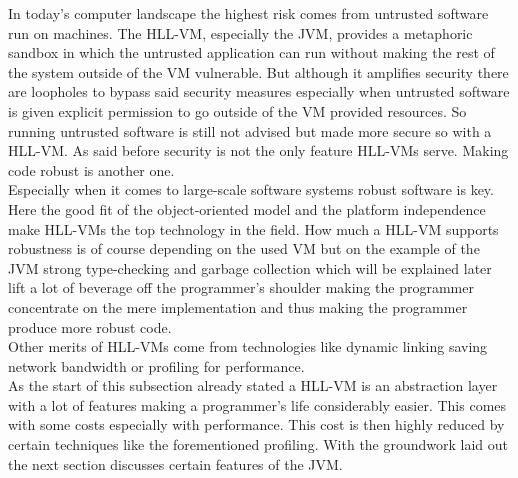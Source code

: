 In today's computer landscape the highest risk comes from untrusted software run on machines. The HLL-VM, especially the JVM,  provides a metaphoric sandbox in which the untrusted application can run without making the rest of the system outside of the VM vulnerable. But although it amplifies security there are loopholes to bypass said security measures especially when untrusted software is given explicit permission to go outside of the VM provided resources. So running untrusted software is still not advised but made more secure so with a HLL-VM. As said before security is not the only feature HLL-VMs serve. Making code robust is another one.\\
Especially when it comes to large-scale software systems robust software is key. Here the good fit of the object-oriented model and the platform independence make HLL-VMs the top technology in the field. How much a HLL-VM supports robustness is of course depending on the used VM but on the example of the JVM strong type-checking and garbage collection which will be explained later lift a lot of beverage off the programmer's shoulder making the programmer concentrate on the mere implementation and thus making the programmer produce more robust code.\\
Other merits of HLL-VMs come from technologies like dynamic linking saving network bandwidth or profiling for performance.\cite{Smith}\\
As the start of this subsection already stated a HLL-VM is an abstraction layer with a lot of features making a programmer's life considerably easier. This comes with some costs especially with performance. This cost is then highly reduced by certain techniques like the forementioned profiling. With the groundwork laid out the next section discusses certain features of the JVM.


